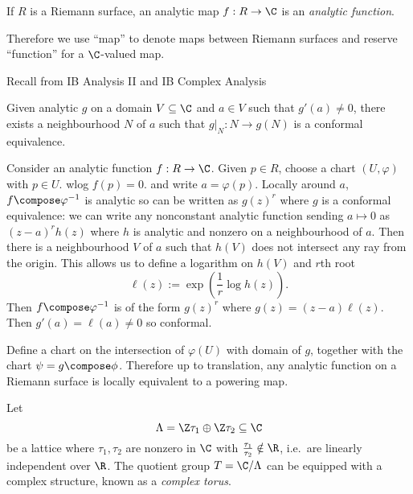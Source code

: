 \documentclass[a4paper]{article}
\begin{document}
\begin{definition}
  If \(R\) is a Riemann surface, an analytic map \(f: R \to \C\) is an \emph{analytic function}.
\end{definition}

Therefore we use ``map'' to denote maps between Riemann surfaces and reserve ``function'' for a \(\C\)-valued map.

Recall from IB Analysis II and IB Complex Analysis

\begin{theorem}
  Given analytic \(g\) on a domain \(V \subseteq \C\) and \(a \in V\) such that \(g'(a) \neq 0\), there exists a neighbourhood \(N\) of \(a\) such that \(g|_N : N \to g(N)\) is a conformal equivalence.
\end{theorem}

Consider an analytic function \(f: R \to \C\). Given \(p \in R\), choose a chart \((U, \varphi)\) with \(p \in U\). wlog \(f(p) = 0\). and write \(a = \varphi(p)\). Locally around \(a\), \(f \compose \varphi^{-1}\) is analytic so can be written as \(g(z)^r\) where \(g\) is a conformal equivalence: we can write any nonconstant analytic function sending \(a \mapsto 0\) as \((z - a)^r h(z)\) where \(h\) is analytic and nonzero on a neighbourhood of \(a\). Then there is a neighbourhood \(V\) of \(a\) such that \(h(V)\) does not intersect any ray from the origin. This allows us to define a logarithm on \(h(V)\) and \(r\)th root
\[
  \ell(z) := \exp( \frac{1}{r} \log h(z)).
\]
Then \(f \compose \varphi^{-1}\) is of the form \(g(z)^r\) where \(g(z) = (z - a)\ell(z)\). Then \(g'(a) = \ell(a) \neq 0\) so conformal.

Define a chart on the intersection of \(\varphi(U)\) with domain of \(g\), together with the chart \(\psi = g \compose \phi\). Therefore up to translation, any analytic function on a Riemann surface is locally equivalent to a powering map.

\begin{definition}
  Let
  \[
    \Lambda = \Z \tau_1 \oplus \Z \tau_2 \subseteq \C
  \]
  be a lattice where \(\tau_1, \tau_2\) are nonzero in \(\C\) with \(\frac{\tau_1}{\tau_2} \notin \R\), i.e.\ are linearly independent over \(\R\). The quotient group \(T = \C / \Lambda\) can be equipped with a complex structure, known as a \emph{complex torus}.
\end{definition}
\end{document}
